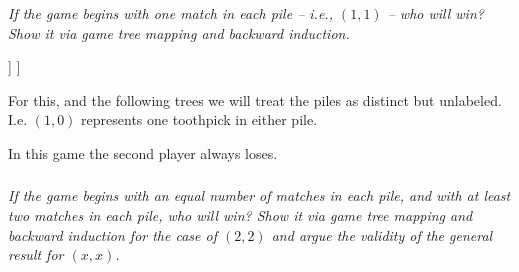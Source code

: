 \documentclass[12pt]{amsart}
\begin{document}
\subsubsection{}
\textit{If the game begins with one match in each pile – i.e., $(1,1)$ – who will win? Show it via
	game tree mapping and backward induction.}
	
	\begin{center}
		\begin{forest}
			[\textcolor{white}{(1,1)}, circle, fill=ForestGreen, draw, font={\bfseries\scriptsize}
				[\textcolor{white}{(1,0)}, circle, fill=Maroon, draw, font={\bfseries\scriptsize}, 
						edge label={node[midway,right]{$p_1$(-1)}} 
					[\textcolor{white}{(0,0)}, circle, fill=Gray, draw, font={\bfseries\scriptsize}, 
						edge label={node[midway,right]{$p_2$(-1)}}
					]
				]
			]
		\end{forest}
	\end{center}
	
	For this, and the following trees we will treat the piles as distinct but unlabeled.
	I.e. $(1,0)$ represents one toothpick in either pile.
	
	In this game the second player always loses.

\subsubsection{}
\textit{If the game begins with an equal number of matches in each pile, and with at least two
	matches in each pile, who will win? Show it via game tree mapping and backward
	induction for the case of $(2,2)$ and argue the validity of the general result for $(x, x)$.}
	
\end{document}
